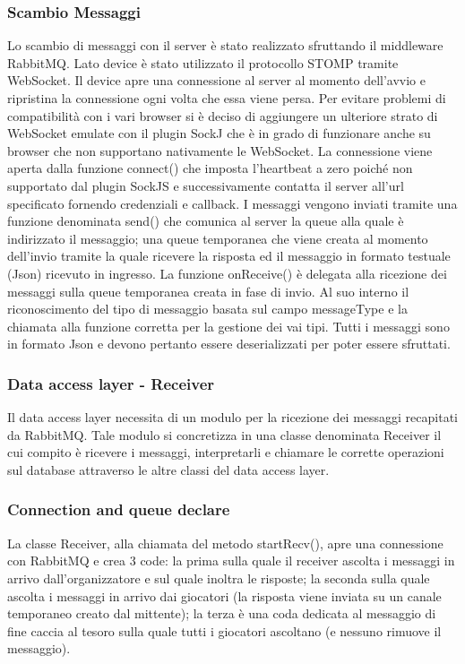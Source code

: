 \documentclass[12pt, italian]{article}
\begin{document}
\subsubsection*{Scambio Messaggi}
Lo scambio di messaggi con il server è stato realizzato sfruttando il middleware RabbitMQ.
Lato device è stato utilizzato il protocollo STOMP tramite WebSocket.
Il device apre una connessione al server al momento dell'avvio e ripristina la connessione ogni volta che essa viene persa.
Per evitare problemi di compatibilità con i vari browser si è deciso di aggiungere un ulteriore strato di WebSocket emulate con il plugin SockJ che è in grado di funzionare anche su browser che non supportano nativamente le WebSocket.
La connessione viene aperta dalla funzione connect() che imposta l'heartbeat a zero poiché non supportato dal plugin SockJS e successivamente contatta il server all'url specificato fornendo credenziali e callback.
I messaggi vengono inviati tramite una funzione denominata send() che comunica al server la queue alla quale è indirizzato il messaggio; una queue temporanea che viene creata al momento dell'invio tramite la quale ricevere la risposta ed il messaggio in formato testuale (Json) ricevuto in ingresso.
La funzione onReceive() è delegata alla ricezione dei messaggi sulla queue temporanea creata in fase di invio. Al suo interno il riconoscimento del tipo di messaggio basata sul campo messageType e la chiamata alla funzione corretta per la gestione dei vai tipi.
Tutti i messaggi sono in formato Json e devono pertanto essere deserializzati per poter essere sfruttati.

\subsubsection{Data access layer - Receiver}
Il data access layer necessita di un modulo per la ricezione dei messaggi recapitati da RabbitMQ. Tale modulo si concretizza in una classe denominata Receiver il cui compito è ricevere i messaggi, interpretarli e chiamare le corrette operazioni sul database attraverso le altre classi del data access layer.

\subsubsection*{Connection and queue declare}
La classe Receiver, alla chiamata del metodo startRecv(), apre una connessione con RabbitMQ e crea 3 code:
la prima sulla quale il receiver ascolta i messaggi in arrivo dall'organizzatore e sul quale inoltra le risposte;
la seconda sulla quale ascolta i messaggi in arrivo dai giocatori (la risposta viene inviata su un canale temporaneo creato dal mittente);
la terza è una coda dedicata al messaggio di fine caccia al tesoro sulla quale tutti i giocatori ascoltano (e nessuno rimuove il messaggio).
\end{document}
